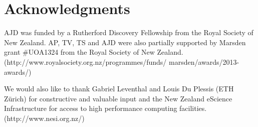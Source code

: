 \documentclass[12pt,titlepage]{article}
\begin{document}
\section{Acknowledgments}
AJD was funded by a Rutherford Discovery Fellowship from the Royal Society of New Zealand. 
AP, TV, TS and AJD were also partially supported by Marsden grant \#UOA1324 from the Royal Society of New Zealand. (http://www.royalsociety.org.nz/programmes/funds/
marsden/awards/2013-awards/) 

We would also like to thank Gabriel Leventhal and Louis Du Plessis (ETH Z\"urich) for constructive and valuable input 
and the New Zealand eScience Infrastructure for access to high performance computing facilities. (http://www.nesi.org.nz/)
%


\end{document}

